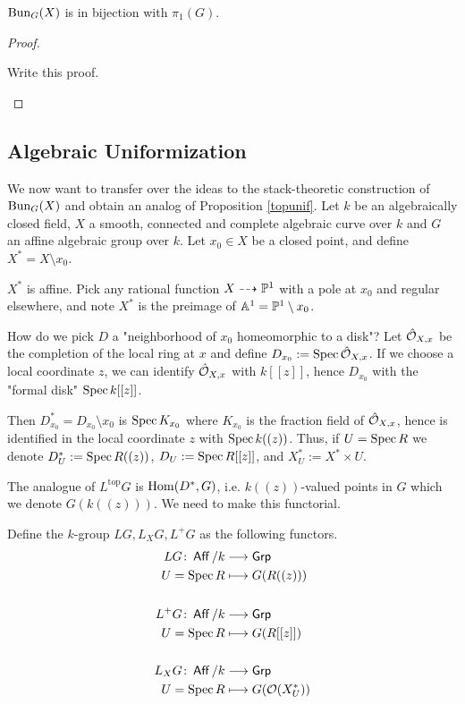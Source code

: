 \documentclass[12pt]{article}
\begin{document}
\begin{cor}
    $\operatorname{Bun}_G(X)$ is in bijection with $\pi_1(G)$. 
\end{cor}

\begin{proof}
    \begin{todo}
        Write this proof.
    \end{todo}
\end{proof}

\subsection{Algebraic Uniformization}\label{unif}

We now want to transfer over the ideas to the stack-theoretic construction of $\operatorname{Bun}_G(X)$ and obtain an analog of Proposition \ref{topunif}. Let $k$ be an algebraically closed field, $X$ a smooth, connected and complete algebraic curve over $k$ and $G$ an affine algebraic group over $k$. Let $x_0 \in X$ be a closed point, and define $X^* = X \setminus x_0$. 
\begin{rem}
    $X^*$ is affine. Pick any rational function $X \dashrightarrow \mathbb{P}^1$ with a pole at $x_0$ and regular elsewhere, and note $X^*$ is the preimage of $\mathbb{A}^1 = \mathbb{P}^1 \setminus x_0$. 
\end{rem}
How do we pick $D$ a "neighborhood of $x_0$ homeomorphic to a disk"? Let $\hat{\mathcal{O}}_{X,x}$ be the completion of the local ring at $x$ and define $D_{x_0} := \operatorname{Spec} \hat{\mathcal{O}}_{X,x}$. If we choose a local coordinate $z$, we can identify $\hat{\mathcal{O}}_{X,x}$ with $k[[z]]$, hence $D_{x_0}$ with the "formal disk" $\operatorname{Spec} k [[z]]$.

Then $D^*_{x_0} = D_{x_0} \setminus x_0$ is $\operatorname{Spec} K_{x_0}$ where $K_{x_0}$ is the fraction field of $\hat{\mathcal{O}}_{X,x}$, hence is identified in the local coordinate $z$ with $\operatorname{Spec} k ((z))$. Thus, if $U = \operatorname{Spec} R$ we denote $D^*_U := \operatorname{Spec} R ((z))$, $D_U := \operatorname{Spec} R [[z]]$, and $X^*_U := X^* \times U$. 

The analogue of $L^{\text{top}} G$ is $\operatorname{Hom}(D^*, G)$, i.e. $k ((z))$-valued points in $G$ which we denote $G(k ((z)))$. We need to make this functorial.
\begin{defn}
    Define the $k$-group $LG, L_X G, L^+G$ as the following functors.
    \begin{align*}
    LG \colon \operatorname{\mathsf{Aff}}/k &\longrightarrow \operatorname{\mathsf{Grp}} \\
    U = \operatorname{Spec} R &\longmapsto G(R ((z))) \\
     \\
    L^+ G \colon \operatorname{\mathsf{Aff}}/k &\longrightarrow \operatorname{\mathsf{Grp}} \\
    U = \operatorname{Spec} R &\longmapsto G(R [[z]]) \\ 
     \\
    L_X G \colon \operatorname{\mathsf{Aff}}/k &\longrightarrow \operatorname{\mathsf{Grp}} \\
    U = \operatorname{Spec} R &\longmapsto G(\mathcal{O}(X^*_U))
\end{align*}
\end{defn}
\end{document}
